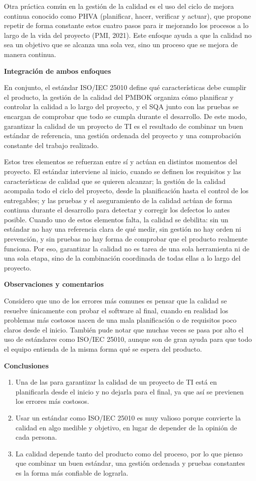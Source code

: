 \documentclass[12pt,letterpaper]{article}
\newcommand{\subtitulo}[1]{\vspace{12pt}\noindent\textbf{#1}\par\vspace{10pt}}
\begin{document}
Otra práctica común en la gestión de la calidad es el uso del ciclo de mejora continua conocido como PHVA (planificar, hacer, verificar y actuar), que propone repetir de forma constante estos cuatro pasos para ir mejorando los procesos a lo largo de la vida del proyecto (PMI, 2021). Este enfoque ayuda a que la calidad no sea un objetivo que se alcanza una sola vez, sino un proceso que se mejora de manera continua.

\subtitulo{Integración de ambos enfoques}
En conjunto, el estándar ISO/IEC 25010 define qué características debe cumplir el producto, la gestión de la calidad del PMBOK organiza cómo planificar y controlar la calidad a lo largo del proyecto, y el SQA junto con las pruebas se encargan de comprobar que todo se cumpla durante el desarrollo. De este modo, garantizar la calidad de un proyecto de TI es el resultado de combinar un buen estándar de referencia, una gestión ordenada del proyecto y una comprobación constante del trabajo realizado.

Estos tres elementos se refuerzan entre sí y actúan en distintos momentos del proyecto. El estándar interviene al inicio, cuando se definen los requisitos y las características de calidad que se quieren alcanzar; la gestión de la calidad acompaña todo el ciclo del proyecto, desde la planificación hasta el control de los entregables; y las pruebas y el aseguramiento de la calidad actúan de forma continua durante el desarrollo para detectar y corregir los defectos lo antes posible. Cuando uno de estos elementos falta, la calidad se debilita: sin un estándar no hay una referencia clara de qué medir, sin gestión no hay orden ni prevención, y sin pruebas no hay forma de comprobar que el producto realmente funciona. Por eso, garantizar la calidad no es tarea de una sola herramienta ni de una sola etapa, sino de la combinación coordinada de todas ellas a lo largo del proyecto.

\subtitulo{Observaciones y comentarios}
Considero que uno de los errores más comunes es pensar que la calidad se resuelve únicamente con probar el software al final, cuando en realidad los problemas más costosos nacen de una mala planificación o de requisitos poco claros desde el inicio. También pude notar que muchas veces se pasa por alto el uso de estándares como ISO/IEC 25010, aunque son de gran ayuda para que todo el equipo entienda de la misma forma qué se espera del producto.

\subtitulo{Conclusiones}
\begin{enumerate}[label=\arabic*., left=0pt, itemsep=2pt]
\item Una de las para garantizar la calidad de un proyecto de TI está en planificarla desde el inicio y no dejarla para el final, ya que así se previenen los errores más costosos.
\item Usar un estándar como ISO/IEC 25010 es muy valioso porque convierte la calidad en algo medible y objetivo, en lugar de depender de la opinión de cada persona.
\item La calidad depende tanto del producto como del proceso, por lo que pienso que combinar un buen estándar, una gestión ordenada y pruebas constantes es la forma más confiable de lograrla.
\end{enumerate}
\end{document}
